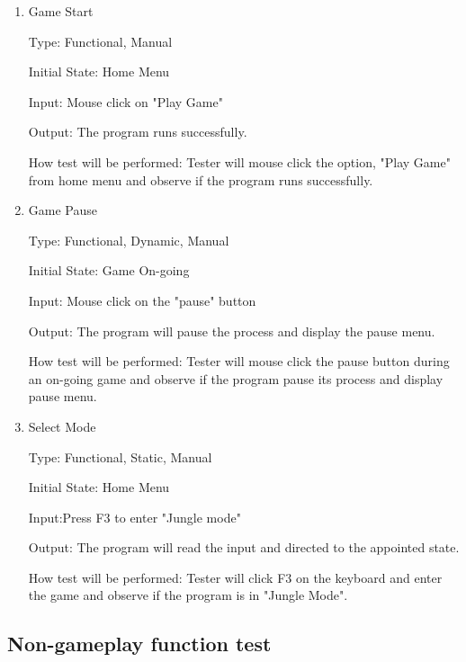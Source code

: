 \documentclass[12pt, titlepage]{article}
\begin{document}
\begin{enumerate}

\item{Game Start\\}

Type: Functional, Manual
					
Initial State: Home Menu
					
Input: Mouse click on "Play Game"
					
Output: The program runs successfully.
					
How test will be performed: Tester will mouse click the option, "Play Game" from home menu and observe if the program runs successfully.
					
\item{Game Pause\\}

Type: Functional, Dynamic, Manual
					
Initial State: Game On-going
					
Input: Mouse click on the "pause" button
					
Output: The program will pause the process and display the pause menu.
					
How test will be performed: Tester will mouse click the pause button during an on-going game and observe if the program pause its process and display pause menu.

\item{Select Mode\\}

Type: Functional, Static, Manual
					
Initial State: Home Menu
					
Input:Press F3 to enter "Jungle mode"
					
Output: The program will read the input and directed to the appointed state.
					
How test will be performed: Tester will click F3 on the keyboard and enter the game and observe if the program is in "Jungle Mode".



\end{enumerate}

\subsection{Non-gameplay function test}
\end{document}
